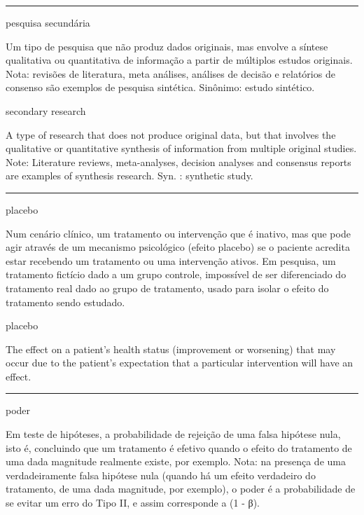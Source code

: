 \documentclass[
  openany]{book}
\begin{document}
\begin{center}\rule{0.5\linewidth}{0.5pt}\end{center}

pesquisa secundária

Um tipo de pesquisa que não produz dados originais, mas envolve a síntese qualitativa ou quantitativa de informação a partir de múltiplos estudos originais. Nota: revisões de literatura, meta análises, análises de decisão e relatórios de consenso são exemplos de pesquisa sintética. Sinônimo: estudo sintético.

secondary research

A type of research that does not produce original data, but that involves the qualitative or quantitative synthesis of information from multiple original studies. Note: Literature reviews, meta-analyses, decision analyses and consensus reports are examples of synthesis research. Syn. : synthetic study.

\begin{center}\rule{0.5\linewidth}{0.5pt}\end{center}

placebo

Num cenário clínico, um tratamento ou intervenção que é inativo, mas que pode agir através de um mecanismo psicológico (efeito placebo) se o paciente acredita estar recebendo um tratamento ou uma intervenção ativos. Em pesquisa, um tratamento fictício dado a um grupo controle, impossível de ser diferenciado do tratamento real dado ao grupo de tratamento, usado para isolar o efeito do tratamento sendo estudado.

placebo

The effect on a patient's health status (improvement or worsening) that may occur due to the patient's expectation that a particular intervention will have an effect.

\begin{center}\rule{0.5\linewidth}{0.5pt}\end{center}

poder

Em teste de hipóteses, a probabilidade de rejeição de uma falsa hipótese nula, isto é, concluindo que um tratamento é efetivo quando o efeito do tratamento de uma dada magnitude realmente existe, por exemplo. Nota: na presença de uma verdadeiramente falsa hipótese nula (quando há um efeito verdadeiro do tratamento, de uma dada magnitude, por exemplo), o poder é a probabilidade de se evitar um erro do Tipo II, e assim corresponde a (1 - β).
\end{document}
